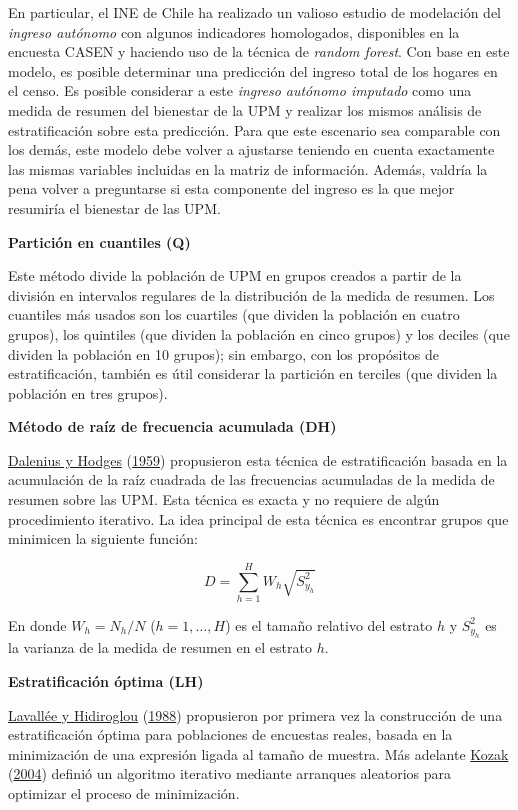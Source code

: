 \documentclass[
  12pt,
  spanish,
]{book}
\begin{document}
En particular, el INE de Chile ha realizado un valioso estudio de modelación del \emph{ingreso autónomo} con algunos indicadores homologados, disponibles en la encuesta CASEN y haciendo uso de la técnica de \emph{random forest}. Con base en este modelo, es posible determinar una predicción del ingreso total de los hogares en el censo. Es posible considerar a este \emph{ingreso autónomo imputado} como una medida de resumen del bienestar de la UPM y realizar los mismos análisis de estratificación sobre esta predicción. Para que este escenario sea comparable con los demás, este modelo debe volver a ajustarse teniendo en cuenta exactamente las mismas variables incluidas en la matriz de información. Además, valdría la pena volver a preguntarse si esta componente del ingreso es la que mejor resumiría el bienestar de las UPM.

\textbf{Partición en cuantiles (Q)}

Este método divide la población de UPM en grupos creados a partir de la división en intervalos regulares de la distribución de la medida de resumen. Los cuantiles más usados son los cuartiles (que dividen la población en cuatro grupos), los quintiles (que dividen la población en cinco grupos) y los deciles (que dividen la población en 10 grupos); sin embargo, con los propósitos de estratificación, también es útil considerar la partición en terciles (que dividen la población en tres grupos).

\textbf{Método de raíz de frecuencia acumulada (DH)}

\protect\hyperlink{ref-Dalenius_Hodges_1959}{Dalenius y Hodges} (\protect\hyperlink{ref-Dalenius_Hodges_1959}{1959}) propusieron esta técnica de estratificación basada en la acumulación de la raíz cuadrada de las frecuencias acumuladas de la medida de resumen sobre las UPM. Esta técnica es exacta y no requiere de algún procedimiento iterativo. La idea principal de esta técnica es encontrar grupos que minimicen la siguiente función:

\[
D = \sum_{h=1}^H W_h \sqrt{S^2_{y_{h}}}
\]

En donde \(W_h = N_h/N\) (\(h = 1, \ldots, H\)) es el tamaño relativo del estrato \(h\) y \(S^2_{y_{h}}\) es la varianza de la medida de resumen en el estrato \(h\).

\textbf{Estratificación óptima (LH)}

\protect\hyperlink{ref-Lavallee_Hidiroglou_1988}{Lavallée y Hidiroglou} (\protect\hyperlink{ref-Lavallee_Hidiroglou_1988}{1988}) propusieron por primera vez la construcción de una estratificación óptima para poblaciones de encuestas reales, basada en la minimización de una expresión ligada al tamaño de muestra. Más adelante \protect\hyperlink{ref-Kozak_2004}{Kozak} (\protect\hyperlink{ref-Kozak_2004}{2004}) definió un algoritmo iterativo mediante arranques aleatorios para optimizar el proceso de minimización.
\end{document}
